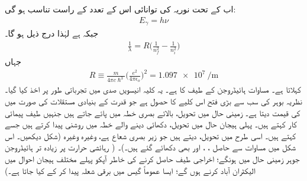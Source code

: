 اب  کے تحت نوریہ کی توانائی اس کے تعدد کے راست تناسب ہو گی:
\begin{align}
E_{\gamma}=h\nu
\end{align}
جبکہ   ہے لہٰذا درج ذیل ہو گا۔
\begin{align}\label{مساوات_تین_ابعادی_رڈبرگ_کلیہ}
\frac{1}{\lambda}=R\big(\frac{1}{n^{2}_{f}}-\frac{1}{n^{2}_{i}}\big)
\end{align}
جہاں 
\begin{align}
R\equiv \frac{m}{4\pi{c}\hslash^{3}}\big(\frac{e^{2}}{4\pi\epsilon_{o}}\big)^{2}=\SI{1.097e7}{\per\meter}
\end{align}
 کہلاتا ہے۔ مساوات  ہائیڈروجن کے طیف کا  ہے۔ یہ کلیہ انیسویں صدی میں تجرباتی طور پر اخذ کیا گیا۔نظریہ بوہر کی سب سے بڑی فتح اس کلیے کا حصول ہے جو قدرت کے بنیادی مستقلات کی صورت میں  کی قیمت دیتا ہے۔ زمینی حال  میں تحویل، بالائے بصری خطہ میں پائے جاتے ہیں جنہیں طیف پیمائی کار  کہتے ہیں۔ پہلی ہیجان حال 
میں تحویل، دکھائی دینے والے خطہ میں روشنی پیدا کرتے ہیں جسے  کہتے ہیں۔ اسی طرح  میں تحویل،  دیتے ہیں جو زیر بصری شعاع ہے، وغیرہ وغیرہ (شکل  دیکھیں۔ اس شکل میں  مساوات  سے حاصل  ، ، اور   بھی دکھائے گئے ہیں۔)۔ ( رہائشی حرارت پر زیادہ تر ہائیڈروجن جوہر زمینی حال میں ہونگے؛ اخراجی طیف حاصل کرنے کی خاطر آپکو پہلے مختلف ہیجان احوال میں الیکٹران آباد کرنے ہوں گے؛ ایسا عموماً گیس میں برقی شعلہ پیدا کر کے کیا جاتا ہے۔)


